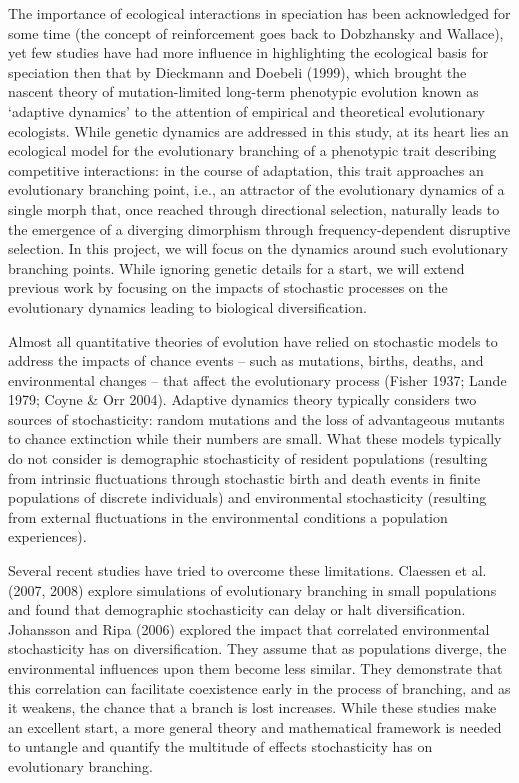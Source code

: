 \documentclass[authoryear,review,11pt]{elsarticle}
\begin{document}
The importance of ecological interactions in speciation has been acknowledged for some time (the concept of reinforcement goes back to Dobzhansky and Wallace), yet few studies have had more influence in highlighting the ecological basis for speciation then that by Dieckmann and Doebeli (1999), which brought the nascent theory of mutation-limited long-term phenotypic evolution known as ‘adaptive dynamics’ to the attention of empirical and theoretical evolutionary ecologists. While genetic dynamics are addressed in this study, at its heart lies an ecological model for the evolutionary branching of a phenotypic trait describing competitive interactions: in the course of adaptation, this trait approaches an evolutionary branching point, i.e., an attractor of the evolutionary dynamics of a single morph that, once reached through directional selection, naturally leads to the emergence of a diverging dimorphism through frequency-dependent disruptive selection. In this project, we will focus on the dynamics around such evolutionary branching points. While ignoring genetic details for a start, we will extend previous work by focusing on the impacts of stochastic processes on the evolutionary dynamics leading to biological diversification.

Almost all quantitative theories of evolution have relied on stochastic models to address the impacts of chance events – such as mutations, births, deaths, and environmental changes – that affect the evolutionary process (Fisher 1937; Lande 1979; Coyne \& Orr 2004). Adaptive dynamics theory typically considers two sources of stochasticity: random mutations and the loss of advantageous mutants to chance extinction while their numbers are small. What these models typically do not consider is demographic stochasticity of resident populations (resulting from intrinsic fluctuations through stochastic birth and death events in finite populations of discrete individuals) and environmental stochasticity (resulting from external fluctuations in the environmental conditions a population experiences).


Several recent studies have tried to overcome these limitations. Claessen et al. (2007, 2008) explore simulations of evolutionary branching in small populations and found that demographic stochasticity can delay or halt diversification. Johansson and Ripa (2006) explored the impact that correlated  environmental stochasticity has on diversification. They assume that as populations diverge, the environmental influences upon them become less similar. They demonstrate that this correlation can facilitate coexistence early in the process of branching, and as it weakens, the chance that a branch is lost increases. While these studies make an excellent start, a more general theory and mathematical framework is needed to untangle and quantify the multitude of effects stochasticity has on evolutionary branching.
\end{document}
